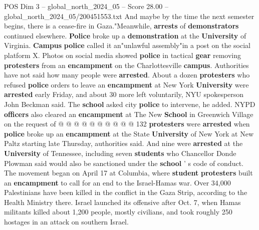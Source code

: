 \begin{textsample}{POS Dim 3 – global\_north\_2024\_05 – Score 28.00 – global\_north\_2024\_05/200451553.txt}
And maybe by the time the next semester begins, there is a cease-fire in Gaza."Meanwhile, \textbf{arrests} of \textbf{demonstrators} continued elsewhere. \textbf{Police} broke up a \textbf{demonstration} at the \textbf{University} of Virginia. \textbf{Campus} \textbf{police} called it an"unlawful assembly"in a post on the social platform X.
Photos on social media showed \textbf{police} in tactical \textbf{gear} removing \textbf{protesters} from an \textbf{encampment} on the Charlottesville \textbf{campus}.
Authorities have not said how many people were \textbf{arrested}.
About a dozen \textbf{protesters} who refused \textbf{police} orders to leave an \textbf{encampment} at New York \textbf{University} were \textbf{arrested} early Friday, and about 30 more left voluntarily, NYU spokesperson John Beckman said.
The \textbf{school} asked city \textbf{police} to intervene, he added.
NYPD \textbf{officers} also cleared an \textbf{encampment} at The New \textbf{School} in Greenwich Village on the request of @ @ @ @ @ @ @ @ @ @ 132 \textbf{protesters} were \textbf{arrested} when \textbf{police} broke up an \textbf{encampment} at the State \textbf{University} of New York at New Paltz starting late Thursday, authorities said.
And nine were \textbf{arrested} at the \textbf{University} of Tennessee, including seven \textbf{students} who Chancellor Donde Plowman said would also be sanctioned under the \textbf{school} ' s code of conduct.
The movement began on April 17 at Columbia, where \textbf{student} \textbf{protesters} built an \textbf{encampment} to call for an end to the Israel-Hamas war.
Over 34,000 Palestinians have been killed in the conflict in the Gaza Strip, according to the Health Ministry there.
Israel launched its offensive after Oct. 7, when Hamas militants killed about 1,200 people, mostly civilians, and took roughly 250 hostages in an attack on southern Israel.

\end{textsample}
